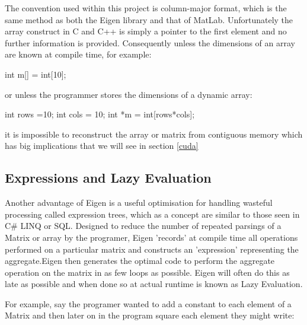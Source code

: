 \documentclass[a4paper]{amsart}
\begin{document}
The convention used within this project is column-major format, which is the same method as both the Eigen library and that of MatLab. Unfortunately the array construct in C and C++ is simply a pointer to the first element and no further information is provided. Consequently unless the dimensions of an array are known at compile time, for example:

int m[] = int[10]; 

or unless the programmer stores the dimensions of a dynamic array:

int rows =10;
int cols = 10;
int *m = int[rows*cols];

it is impossible to reconstruct the array or matrix from contiguous memory which has big implications that we will see in section \ref{cuda}


\subsection{Expressions and Lazy Evaluation}

Another advantage of Eigen is a useful optimisation for handling wasteful processing called expression trees, which as a concept are similar to those seen in C\# LINQ or SQL. Designed to reduce the number of repeated parsings of a Matrix or array by the programer, Eigen 'records' at compile time all operations performed on a particular matrix and constructs an 'expression' representing the aggregate.Eigen then generates the optimal code to perform the aggregate operation on the matrix in as few loops as possible. Eigen will often do this as late as possible and when done so at actual runtime is known as Lazy Evaluation.

For example, say the programer wanted to add a constant to each element of a Matrix and then later on in the program square each element they might write:


\end{document}
